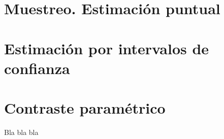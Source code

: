 \documentclass[a4paper]{book}
\begin{document}
\section{Muestreo. Estimación puntual}

\section{Estimación por intervalos de confianza}

\section{Contraste paramétrico}
Bla bla bla



%
%
\end{document}
